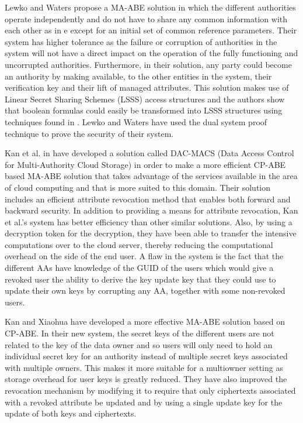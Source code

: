 Lewko and Waters propose a MA-ABE\cite{Lewko2011a}\cite{Lewko2011b} solution in which the different authorities operate independently and do not have to share any common information with each other as in \cite{Chase2007} e except for an initial set of common reference parameters. Their system has higher tolerance as the failure or corruption of authorities in the system will not have a direct impact on the operation of the fully functioning and uncorrupted authorities. Furthermore, in their solution, any party could become an authority by making available, to the other entities in the system, their verification key and their lift of managed attributes. This solution makes use of Linear Secret Sharing Schemes (LSSS) access structures and the authors show that boolean formulas could easily be transformed into LSSS structures using techniques found in \cite{Lewko2011b}. Lewko and Waters have used the dual system proof technique to prove the security of their system.

Kan et al. in \cite{Yang2013} have developed a solution called DAC-MACS (Data Access Control for Multi-Authority Cloud Storage) in order to make a more efficient CP-ABE based MA-ABE solution that takes advantage of the services available in the area of cloud computing and that is more suited to this domain. Their solution includes an efficient attribute revocation method that enables both forward and backward security. In addition to providing a means for attribute revocation, Kan et al.'s system\cite{Yang2013} has better efficiency than other similar solutions. Also, by using a decryption token for the decryption, they have been able to transfer the intensive computations over to the cloud server, thereby reducing the computational overhead on the side of the end user. A flaw in the system is the fact that the different AAs have knowledge of the GUID of the users which would give a revoked user the ability to derive the key update key that they could use to update their own keys by corrupting any AA, together with some non-revoked users.

Kan and Xiaohua\cite{Yang2014} have developed a more effective MA-ABE solution based on CP-ABE. In their new system, the secret keys of the different users are not related to the key of the data owner and so users will only need to hold an individual secret key for an authority instead of multiple secret keys associated with multiple owners. This makes it more suitable for a multiowner setting as storage overhead for user keys is greatly reduced. They have also improved the revocation mechanism by modifying it to require that only ciphertexts associated with a revoked attribute be updated and by using a single update key for the update of both keys and ciphertexts.


